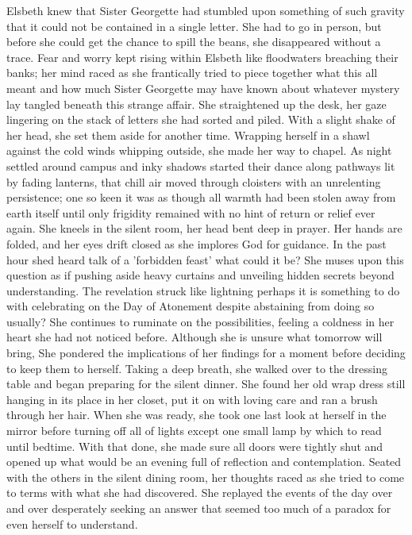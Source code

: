 \documentclass[11pt]{article}
\begin{document}
Elsbeth knew that Sister Georgette had stumbled upon something of such gravity that it could not be contained in a single letter. She had to go in person, but before she could get the chance to spill the beans, she disappeared without a trace. Fear and worry kept rising within Elsbeth like floodwaters breaching their banks; her mind raced as she frantically tried to piece together what this all meant and how much Sister Georgette may have known about whatever mystery lay tangled beneath this strange affair. She straightened up the desk, her gaze lingering on the stack of letters she had sorted and piled. With a slight shake of her head, she set them aside for another time. Wrapping herself in a shawl against the cold winds whipping outside, she made her way to chapel. As night settled around campus and inky shadows started their dance along pathways lit by fading lanterns, that chill air moved through cloisters with an unrelenting persistence; one so keen it was as though all warmth had been stolen away from earth itself until only frigidity remained with no hint of return or relief ever again.
She kneels in the silent room, her head bent deep in prayer. Her hands are folded, and her eyes drift closed as she implores God for guidance. In the past hour shed heard talk of a 'forbidden feast' what could it be? She muses upon this question as if pushing aside heavy curtains and unveiling hidden secrets beyond understanding. The revelation struck like lightning perhaps it is something to do with celebrating on the Day of Atonement despite abstaining from doing so usually?
She continues to ruminate on the possibilities, feeling a coldness in her heart she had not noticed before. Although she is unsure what tomorrow will bring, She pondered the implications of her findings for a moment before deciding to keep them to herself. Taking a deep breath, she walked over to the dressing table and began preparing for the silent dinner. She found her old wrap dress still hanging in its place in her closet, put it on with loving care and ran a brush through her hair.
When she was ready, she took one last look at herself in the mirror before turning off all of lights except one small lamp by which to read until bedtime. With that done, she made sure all doors were tightly shut and opened up what would be an evening full of reflection and contemplation.
Seated with the others in the silent dining room, her thoughts raced as she tried to come to terms with what she had discovered. She replayed the events of the day over and over desperately seeking an answer that seemed too much of a paradox for even herself to understand.
\end{document}
